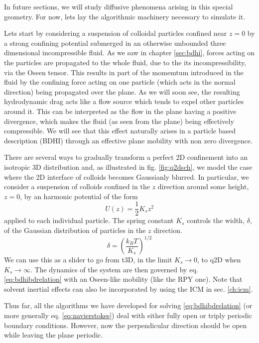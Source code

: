 \documentclass[ twoside,openright,titlepage,numbers=noenddot,%
headinclude,footinclude,cleardoublepage=empty,abstract=on,
BCOR=5mm,paper=a4,fontsize=11pt, dvipsnames
]{scrreprt}
\newcommand{\kT}{k_B T}
\newcommand{\half}{\frac{1}{2}}
\begin{document}
In future sections, we will study diffusive phenomena arising in this special geometry. For now, lets lay the algorithmic machinery necessary to simulate it.

Lets start by considering a suspension of colloidal particles confined near $z=0$ by a strong confining potential submerged in an otherwise unbounded three dimensional incompressible fluid. As we saw in chapter \ref{sec:bdhi}, forces acting on the particles are propagated to the whole fluid, due to the its incompressibility, via the Oseen tensor. This results in part of the momemtum introduced in the fluid by the confining force acting on one particle (which acts in the normal direction) being propagated over the plane. As we will soon see, the resulting hydrodynamic drag acts like a flow source which tends to expel other particles around it. This can be interpreted as the flow in the plane having a positive divergence, which makes the fluid (as seen from the plane) being effectively compressible. We will see that this effect naturally arises in a particle based description (\gls{BDHI}) through an effective plane mobility with non zero divergence\cite{Pelaez2017}.

There are several ways to gradually transform a perfect 2D confinement into an isotropic 3D distribution and, as illustrated in fig. \ref{fig:q2dsch}, we model the case where the 2D interface of colloids becomes Gaussianly blurred. In particular, we consider a suspension of colloids confined in the $z$ direction around some height, $z=0$, by an harmonic potential of the form
\begin{equation}
U(z)=\half K_sz^2
\end{equation}
applied to each individual particle.
The spring constant $K_s$ controls the width, $\delta$, of the Gaussian distribution of particles in the $z$ direction.
\begin{equation}
  \delta = \left(\frac{\kT}{K_s}\right)^{1/2}
\end{equation}
We can use this as a slider to go from t3D, in the limit $K_s\rightarrow 0$, to q2D when $K_s\rightarrow\infty$.
The dynamics of the system are then governed by eq. \eqref{eq:bdhibdrelation} with an Oseen-like mobility (like the \gls{RPY} one). Note that solvent inertial effects can also be incorporated by using the \gls{ICM} in sec. \ref{ch:icm}.

Thus far, all the algorithms we have developed for solving \eqref{eq:bdhibdrelation} (or more generally eq. \eqref{eq:navierstokes}) deal with either fully open or triply periodic boundary conditions. However, now the perpendicular direction should be open while leaving the plane periodic.
\end{document}

